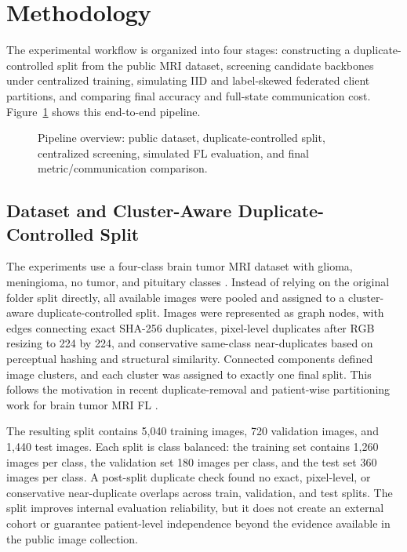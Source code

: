 \documentclass[10pt,twocolumn]{article}
\begin{document}
\section{Methodology}
The experimental workflow is organized into four stages: constructing a duplicate-controlled split from the public MRI dataset, screening candidate backbones under centralized training, simulating IID and label-skewed federated client partitions, and comparing final accuracy and full-state communication cost. Figure~\ref{fig:pipeline} shows this end-to-end pipeline.

\begin{figure}[t]
\centering
\resizebox{\textwidth}{!}{}
\caption{Pipeline overview: public dataset, duplicate-controlled split, centralized screening, simulated FL evaluation, and final metric/communication comparison.}
\label{fig:pipeline}
\end{figure}

\subsection{Dataset and Cluster-Aware Duplicate-Controlled Split}
The experiments use a four-class brain tumor MRI dataset with glioma, meningioma, no tumor, and pituitary classes \cite{nickparvar_brain_tumor_mri}. Instead of relying on the original folder split directly, all available images were pooled and assigned to a cluster-aware duplicate-controlled split. Images were represented as graph nodes, with edges connecting exact SHA-256 duplicates, pixel-level duplicates after RGB resizing to 224 by 224, and conservative same-class near-duplicates based on perceptual hashing and structural similarity. Connected components defined image clusters, and each cluster was assigned to exactly one final split. This follows the motivation in recent duplicate-removal and patient-wise partitioning work for brain tumor MRI FL \cite{melo2026exploiting,siam2026brain}.

The resulting split contains 5,040 training images, 720 validation images, and 1,440 test images. Each split is class balanced: the training set contains 1,260 images per class, the validation set 180 images per class, and the test set 360 images per class. A post-split duplicate check found no exact, pixel-level, or conservative near-duplicate overlaps across train, validation, and test splits. The split improves internal evaluation reliability, but it does not create an external cohort or guarantee patient-level independence beyond the evidence available in the public image collection.
\end{document}
